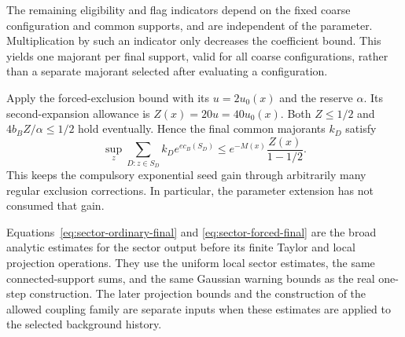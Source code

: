 The remaining eligibility and flag indicators depend on the fixed
coarse configuration and common supports, and are independent of
the parameter. Multiplication by such an indicator only decreases
the coefficient bound. This yields one majorant per final support,
valid for all coarse configurations, rather than a separate
majorant selected after evaluating a configuration.

Apply the forced-exclusion bound with its $u=2u_0(x)$ and the
reserve $\alpha$. Its second-expansion allowance is
$Z(x)=20u=40u_0(x)$. Both $Z\le1/2$ and
$4b_BZ/\alpha\le1/2$ hold eventually. Hence the final common
majorants $k_D$ satisfy
\begin{equation}\label{eq:sector-forced-final}
        \sup_z\sum_{D:z\in S_D}k_De^{e c_B(S_D)}
                            \le e^{-M(x)}\frac{Z(x)}{1-1/2}.
\end{equation}
This keeps the compulsory exponential seed gain through arbitrarily
many regular exclusion corrections. In particular, the parameter
extension has not consumed that gain.

Equations~\eqref{eq:sector-ordinary-final} and
\eqref{eq:sector-forced-final} are the broad analytic estimates
for the sector output before its finite Taylor and local
projection operations. They use the uniform local sector estimates,
the same connected-support sums, and the same Gaussian warning
bounds as the real one-step construction. The later projection
bounds and the construction of the allowed coupling family are
separate inputs when these estimates are applied to the selected
background history.
